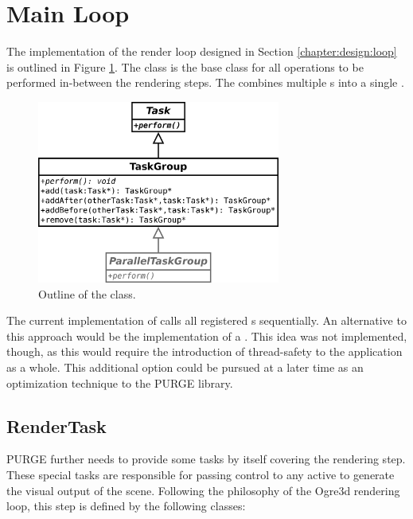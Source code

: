 \section{Main Loop}
\label{chapter:implementation:loop}

	The implementation of the render loop designed in Section \ref{chapter:design:loop} is outlined in Figure \ref{fig:TaskGroup}. The  class is the base class for all operations to be performed in-between the rendering steps. The  combines multiple s into a single .

	\begin{figure}[htbp]
		\centering
		\includegraphics[width=8cm]{images/TaskGroup.png}
		\caption{Outline of the  class.}
		\label{fig:TaskGroup}
	\end{figure}

	The current implementation of  calls all registered s sequentially. An alternative to this approach would be the implementation of a . This idea was not implemented, though, as this would require the introduction of thread-safety to the application as a whole. This additional option could be pursued at a later time as an optimization technique to the PURGE library.
	
	\subsection{RenderTask}

		PURGE further needs to provide some tasks by itself covering the rendering step. These special tasks are responsible for passing control to any active  to generate the visual output of the scene. Following the philosophy of the Ogre3d rendering loop, this step is defined by the following  classes:

